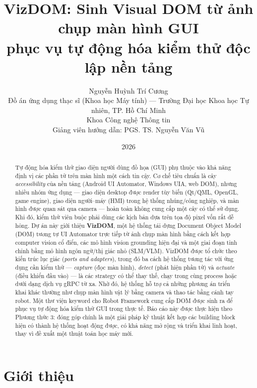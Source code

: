 \documentclass[11pt,a4paper]{article}
\title{\textbf{VizDOM: Sinh Visual DOM từ ảnh chụp màn hình GUI\\
phục vụ tự động hóa kiểm thử độc lập nền tảng}}
\author{Nguyễn Huỳnh Trí Cương\\
\small Đồ án ứng dụng thạc sĩ (Khoa học Máy tính) --- Trường Đại học Khoa học Tự nhiên, TP. Hồ Chí Minh\\
\small Khoa Công nghệ Thông tin\\
\small Giảng viên hướng dẫn: PGS. TS. Nguyễn Văn Vũ}
\date{2026}
\begin{document}
\maketitle

\begin{abstract}
\noindent
Tự động hóa kiểm thử giao diện người dùng đồ họa (GUI) phụ thuộc vào khả năng định vị
các phần tử trên màn hình một cách tin cậy. Cơ chế tiêu chuẩn là cây
\emph{accessibility} của nền tảng (Android UI Automator, Windows UIA, web DOM),
nhưng nhiều nhóm ứng dụng --- giao diện desktop được render tùy biến (Qt/QML,
OpenGL, game engine), giao diện người--máy (HMI) trong hệ thống nhúng/công nghiệp,
và màn hình được quan sát qua camera --- hoàn toàn không cung cấp một cây có thể
sử dụng. Khi đó, kiểm thử viên buộc phải dùng các kịch bản dựa trên tọa độ pixel vốn
rất dễ hỏng. Dự án này giới thiệu \textbf{VizDOM}, một hệ thống tái dựng Document
Object Model (DOM) tương tự UI Automator trực tiếp từ ảnh chụp màn hình bằng cách
kết hợp computer vision cổ điển, các mô hình vision grounding hiện đại và một giai
đoạn tinh chỉnh bằng mô hình ngôn ngữ/thị giác nhỏ (SLM/VLM). VizDOM được tổ chức
theo kiến trúc lục giác (\emph{ports and adapters}), trong đó ba cách hệ thống tương
tác với ứng dụng cần kiểm thử --- \emph{capture} (đọc màn hình), \emph{detect}
(phát hiện phần tử) và \emph{actuate} (điều khiển đầu vào) --- là các strategy có
thể thay thế, chạy trong cùng process hoặc dưới dạng dịch vụ gRPC từ xa. Nhờ đó,
hệ thống hỗ trợ cả những phương án triển khai khác thường như chụp màn hình vật lý
bằng camera và thao tác bằng cánh tay robot. Một thư viện keyword cho Robot
Framework cung cấp DOM được sinh ra để phục vụ tự động hóa kiểm thử GUI trong thực
tế. Báo cáo này được thực hiện theo Phương thức 3: đóng góp chính là
một giải pháp kỹ thuật kết hợp các building block hiện có thành hệ thống hoạt động
được, có khả năng mở rộng và triển khai linh hoạt, thay vì đề xuất một thuật toán
học máy mới.
\end{abstract}

\newpage
\tableofcontents
\newpage

\section{Giới thiệu}
\end{document}
